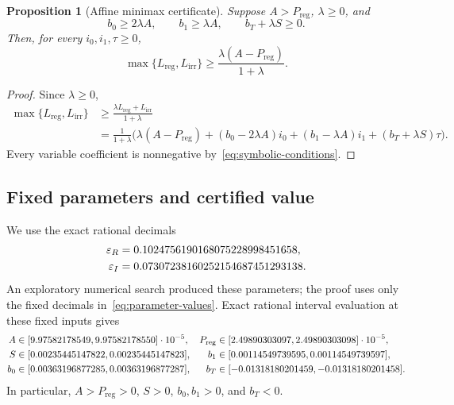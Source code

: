 \documentclass[11pt]{article}
\newtheorem{proposition}[theorem]{Proposition}
\newcommand{\eps}{\varepsilon}
\newcommand{\Lreg}{L_{\mathrm{reg}}}
\newcommand{\Lirr}{L_{\mathrm{irr}}}
\newcommand{\Preg}{P_{\mathrm{reg}}}
\begin{document}
\begin{proposition}[Affine minimax certificate]\label{prop:certificate}
Suppose $A>\Preg$, $\lambda\ge0$, and
\begin{equation}\label{eq:symbolic-conditions}
 b_0\ge2\lambda A,
 \qquad
 b_1\ge\lambda A,
 \qquad
 b_T+\lambda S\ge0.
\end{equation}
Then, for every $i_0,i_1,\tau\ge0$,
\begin{equation}\label{eq:symbolic-gamma}
 \max\{\Lreg,\Lirr\}
 \ge
 \frac{\lambda(A-\Preg)}{1+\lambda}.
\end{equation}
\end{proposition}

\begin{proof}
Since $\lambda\ge0$,
\begin{align*}
 \max\{\Lreg,\Lirr\}
 &\ge \frac{\lambda\Lreg+\Lirr}{1+\lambda}\\
 &=\frac{1}{1+\lambda}
 \bigl(
   \lambda(A-\Preg)
   +(b_0-2\lambda A)i_0
   +(b_1-\lambda A)i_1
   +(b_T+\lambda S)\tau
 \bigr).
\end{align*}
Every variable coefficient is nonnegative by~\eqref{eq:symbolic-conditions}.
\end{proof}

\subsection{Fixed parameters and certified value}

We use the exact rational decimals
\begin{align}
 \eps_R&=0.1024756190168075228998451658,
 \notag\\
 \eps_I&=0.07307238160252154687451293138.
 \label{eq:parameter-values}
\end{align}
An exploratory numerical search produced these parameters; the proof uses only the fixed decimals in~\eqref{eq:parameter-values}.  Exact rational interval evaluation at these fixed inputs gives
\begin{align}
 A&\in[9.97582178549,9.97582178550]\cdot10^{-5},
 &\Preg&\in[2.49890303097,2.49890303098]\cdot10^{-5},
 \notag\\
 S&\in[0.00235445147822,0.00235445147823],
 &b_1&\in[0.00114549739595,0.00114549739597],
 \notag\\
 b_0&\in[0.00363196877285,0.00363196877287],
 &b_T&\in[-0.01318180201459,-0.01318180201458].
 \label{eq:coefficient-intervals}
\end{align}
In particular, $A>\Preg>0$, $S>0$, $b_0,b_1>0$, and $b_T<0$.
\end{document}

